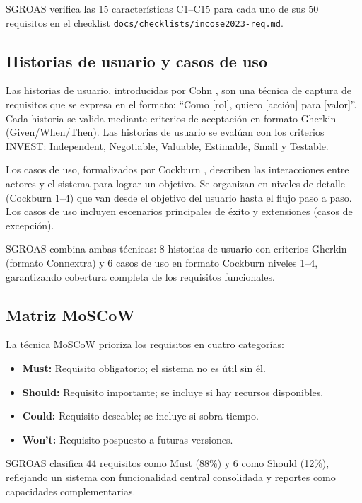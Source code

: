 SGROAS verifica las 15 características C1--C15 para cada uno de sus 50 requisitos en el checklist \texttt{docs/checklists/incose2023-req.md}.

\subsection{Historias de usuario y casos de uso}
\label{sec:hu-cu}

Las historias de usuario, introducidas por Cohn \cite{cohn2004}, son una técnica de captura de requisitos que se expresa en el formato: ``Como [rol], quiero [acción] para [valor]''. Cada historia se valida mediante criterios de aceptación en formato Gherkin (Given/When/Then). Las historias de usuario se evalúan con los criterios INVEST: Independent, Negotiable, Valuable, Estimable, Small y Testable.

Los casos de uso, formalizados por Cockburn \cite{cockburn2001}, describen las interacciones entre actores y el sistema para lograr un objetivo. Se organizan en niveles de detalle (Cockburn 1--4) que van desde el objetivo del usuario hasta el flujo paso a paso. Los casos de uso incluyen escenarios principales de éxito y extensiones (casos de excepción).

SGROAS combina ambas técnicas: 8 historias de usuario con criterios Gherkin (formato Connextra) y 6 casos de uso en formato Cockburn niveles 1--4, garantizando cobertura completa de los requisitos funcionales.

\subsection{Matriz MoSCoW}
\label{sec:moscow}

La técnica MoSCoW \cite{wiegers2013} prioriza los requisitos en cuatro categorías:
\begin{itemize}
  \item \textbf{Must:} Requisito obligatorio; el sistema no es útil sin él.
  \item \textbf{Should:} Requisito importante; se incluye si hay recursos disponibles.
  \item \textbf{Could:} Requisito deseable; se incluye si sobra tiempo.
  \item \textbf{Won't:} Requisito pospuesto a futuras versiones.
\end{itemize}

SGROAS clasifica 44 requisitos como Must (88\%) y 6 como Should (12\%), reflejando un sistema con funcionalidad central consolidada y reportes como capacidades complementarias.

